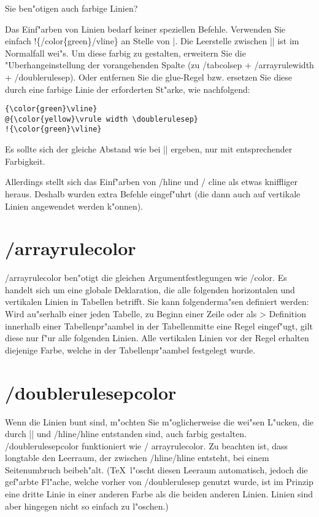 \documentclass[ngerman]{article}
\begin{document}
Sie ben"otigen auch farbige Linien?

Das Einf"arben von Linien bedarf keiner speziellen Befehle. Verwenden Sie
einfach !\{\slash \textsf{color}\{green\}\slash \textsf{vline}\} an Stelle von |. Die Leerstelle 
zwischen || ist im Normalfall wei"s. Um diese farbig zu gestalten, erweitern Sie die 
"Uberhangeinstellung der vorangehenden Spalte (zu \slash \textsf{tabcolsep}
+ \slash \textsf{arrayrulewidth} + \slash \textsf{doublerulesep}). Oder entfernen Sie die glue-Regel 
bzw. ersetzen Sie diese durch eine farbige Linie der erforderten St"arke,
wie nachfolgend: 

\begin{verbatim}
{\color{green}\vline}
@{\color{yellow}\vrule width \doublerulesep}
!{\color{green}\vline}
\end{verbatim}

Es sollte sich der gleiche Abstand wie bei || ergeben, nur mit entsprechender Farbigkeit.

Allerdings stellt sich das Einf"arben von \slash \textsf{hline} und \slash
\textsf{cline} als etwas kniffliger heraus. Deshalb wurden extra Befehle eingef"uhrt (die dann auch 
auf vertikale Linien angewendet werden k"onnen).

\section{\slash \textsf{arrayrulecolor}}

\slash \textsf{arrayrulecolor} ben"otigt die gleichen Argumentfestlegungen
wie \slash \textsf{color}. Es handelt sich um eine globale Deklaration, die alle folgenden 
horizontalen und vertikalen Linien in Tabellen betrifft. Sie kann
folgenderma"sen definiert werden: Wird au"serhalb einer jeden Tabelle, zu Beginn einer Zeile oder 
als > Definition innerhalb einer Tabellenpr"aambel in der Tabellenmitte eine Regel eingef"ugt, gilt 
diese nur f"ur alle folgenden Linien. Alle vertikalen Linien vor der Regel erhalten diejenige Farbe, 
welche in der Tabellenpr"aambel festgelegt wurde.

\section{\slash \textsf{doublerulesepcolor}}
Wenn die Linien bunt sind, m"ochten Sie m"oglicherweise die wei"sen L"ucken, die durch || und 
\slash \textsf{hline}\slash \textsf{hline} entstanden sind, auch farbig gestalten. 
\slash \textsf{doublerulesepcolor} funktioniert wie \slash
\textsf{arrayrulecolor}. Zu beachten ist, dass \textsf{longtable} den Leerraum, der zwischen 
\slash \textsf{hline}\slash \textsf{hline} entsteht, bei einem
Seitenumbruch beibeh"alt. (\TeX\ 
l"oscht diesen Leeraum automatisch, jedoch  die gef"arbte Fl"ache, welche
vorher von \slash \textsf{doublerulesep} genutzt wurde, 
ist im Prinzip eine dritte Linie in einer anderen Farbe als die beiden 
anderen Linien. Linien sind aber hingegen nicht so einfach zu l"oschen.)
\end{document}
